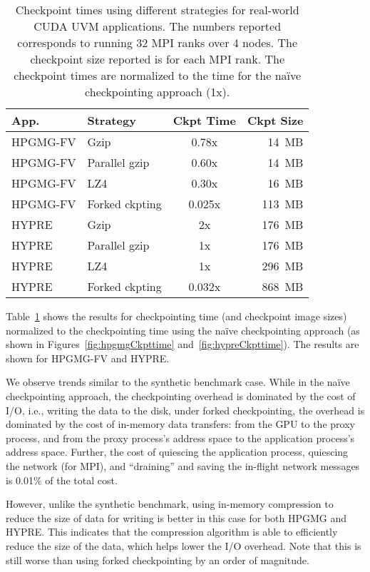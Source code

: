 \documentclass[11pt]{article}
\begin{document}
\begin{table}[ht]
  \caption{\label{tbl:realWorldCkpting} Checkpoint times using different strategies for real-world CUDA UVM applications. The numbers
  reported corresponds to running 32 MPI ranks over 4 nodes. The checkpoint size reported is for each MPI rank. The checkpoint times are normalized to the time for the na{\"i}ve checkpointing approach (1x).}
\centering
  \begin{tabular}{|l|l|c|r|}
  \hline
    App. & Strategy & Ckpt Time & Ckpt Size  \\
  \hline
    HPGMG-FV & Gzip  & 0.78x & 14~MB  \\
  \hline
    HPGMG-FV & Parallel gzip  & 0.60x & 14~MB  \\
  \hline
    HPGMG-FV & LZ4  & 0.30x & 16~MB  \\
  \hline
    HPGMG-FV & Forked ckpting & 0.025x  & 113~MB  \\
  \hline
    HYPRE & Gzip  & 2x  & 176~MB  \\
  \hline
    HYPRE & Parallel gzip  & 1x  & 176~MB  \\
  \hline
    HYPRE & LZ4   & 1x  & 296~MB  \\
  \hline
    HYPRE & Forked ckpting  & 0.032x  & 868~MB  \\
  \hline
\end{tabular}
\end{table}

Table~\ref{tbl:realWorldCkpting} shows the results for checkpointing time (and checkpoint
image sizes) normalized to the checkpointing time using the na{\"i}ve
checkpointing approach (as shown in Figures~\ref{fig:hpgmgCkpttime} and~\ref{fig:hypreCkpttime}). The results are
shown for HPGMG-FV and HYPRE.

We observe trends similar to the synthetic benchmark case. While in the na{\"i}ve
checkpointing approach, the checkpointing overhead is dominated by the cost of
I/O, i.e., writing the data to the disk, under forked checkpointing, the
overhead is dominated by the cost of in-memory data transfers: from the GPU to
the proxy process, and from the proxy process's address space to the
application
process's address space. Further, the cost of quiescing the application
process,
quiescing the network (for MPI), and ``draining'' and saving the in-flight
network
messages is 0.01\% of the total cost.

However, unlike the synthetic benchmark, using in-memory compression to reduce
the size of data for writing is better in this case for both HPGMG and HYPRE.
This indicates that the compression algorithm is able to efficiently reduce the
size of the data, which helps lower the I/O overhead. Note that this is still
worse than using forked checkpointing by an order of magnitude.
\end{document}
